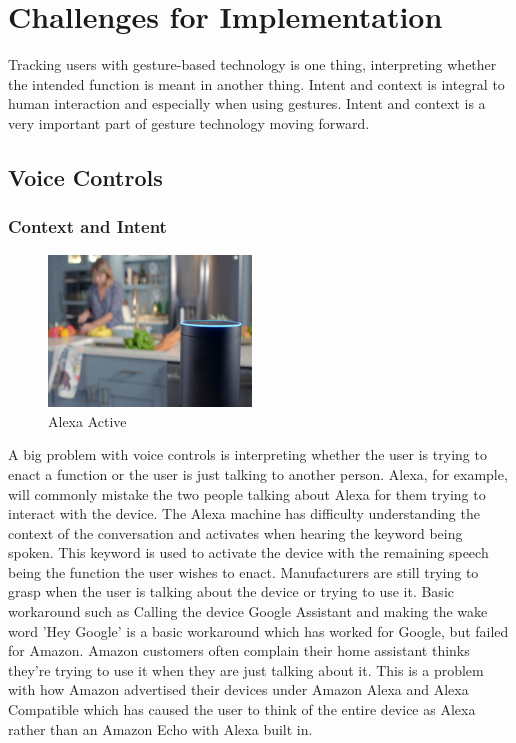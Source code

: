\chapter{Challenges for Implementation}
Tracking users with gesture-based technology is one thing, interpreting whether the intended function is meant in another thing. Intent and context is integral to human interaction and especially when using gestures. Intent and context is a very important part of gesture technology moving forward.

\section{Voice Controls}
\subsection{Context and Intent}

\begin{figure}
  \begin{center}
    \includegraphics[width=0.48\textwidth]{img/alexa.jpg}
  \end{center}
  \caption{Alexa Active}
\end{figure}

A big problem with voice controls is interpreting whether the user is trying to enact a function or the user is just talking to another person. Alexa, for example, will commonly mistake the two people talking about Alexa for them trying to interact with the device. The Alexa machine has difficulty understanding the context of the conversation and activates when hearing the keyword being spoken. This keyword is used to activate the device with the remaining speech being the function the user wishes to enact. Manufacturers are still trying to grasp when the user is talking about the device or trying to use it. Basic workaround such as Calling the device Google Assistant and making the wake word 'Hey Google' is a basic workaround which has worked for Google, but failed for Amazon. Amazon customers often complain their home assistant thinks they're trying to use it when they are just talking about it. This is a problem with how Amazon advertised their devices under Amazon Alexa and Alexa Compatible which has caused the user to think of the entire device as Alexa rather than an Amazon Echo with Alexa built in.

